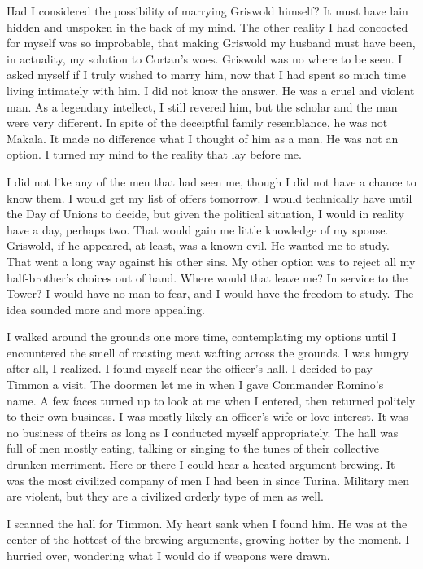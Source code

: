 \documentclass{article}
\begin{document}
Had I considered the possibility of marrying Griswold himself? It must have lain hidden and unspoken in the back of my mind. The other reality I had concocted for myself was so improbable, that making Griswold my husband must have been, in actuality, my solution to Cortan's woes. Griswold was no where to be seen. I asked myself if I truly wished to marry him, now that I had spent so much time living intimately with him. I did not know the answer. He was a cruel and violent man. As a legendary intellect, I still revered him, but the scholar and the man were very different. In spite of the deceiptful family resemblance, he was not Makala. It made no difference what I thought of him as a man. He was not an option. I turned my mind to the reality that lay before me.

I did not like any of the men that had seen me, though I did not have a chance to know them. I would get my list of offers tomorrow. I would technically have until the Day of Unions to decide, but given the political situation, I would in reality have a day, perhaps two. That would gain me little knowledge of my spouse. Griswold, if he appeared, at least, was a known evil. He wanted me to study. That went a long way against his other sins. My other option was to reject all my half-brother's choices out of hand. Where would that leave me? In service to the Tower? I would have no man to fear, and I would have the freedom to study. The idea sounded more and more appealing. 

I walked around the grounds one more time, contemplating my options until I encountered the smell of roasting meat wafting across the grounds. I was hungry after all, I realized. I found myself near the officer's hall. I decided to pay Timmon a visit. The doormen let me in when I gave Commander Romino's name. A few faces turned up to look at me when I entered, then returned politely to their own business. I was mostly likely an officer's wife or love interest. It was no business of theirs as long as I conducted myself appropriately. The hall was full of men mostly eating, talking or singing to the tunes of their collective drunken merriment. Here or there I could hear a heated argument brewing. It was the most civilized company of men I had been in since Turina. Military men are violent, but they are a civilized orderly type of men as well.

I scanned the hall for Timmon. My heart sank when I found him. He was at the center of the hottest of the brewing arguments, growing hotter by the moment. I hurried over, wondering what I would do if weapons were drawn. 
\end{document}

